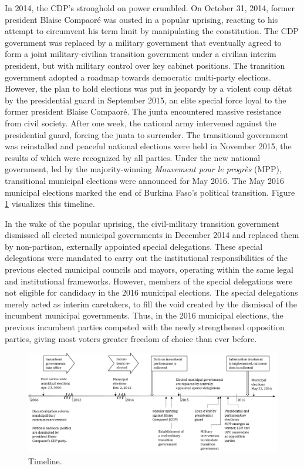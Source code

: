 \documentclass[11pt]{article}
\begin{document}
In 2014, the CDP's stronghold on power crumbled. On October 31, 2014, former president Blaise Compaor\'{e} was ousted in a popular uprising, reacting to his attempt to circumvent his term limit by manipulating the constitution. The CDP government was replaced by a military government that eventually agreed to form a joint military-civilian transition government under a civilian interim president, but with military control over key cabinet positions. The transition government adopted a roadmap towards democratic multi-party elections. However, the plan to hold elections was put in jeopardy by a violent coup d\'{e}tat by the presidential guard in September 2015, an elite special force loyal to the former president Blaise Compaor\'{e}. The junta encountered massive resistance from civil society. After one week, the national army intervened against the presidential guard, forcing the junta to surrender. The transitional government was reinstalled and peaceful national elections were held in November 2015, the results of which were recognized by all parties. Under the new national government, led by the majority-winning \emph{Mouvement pour le progr\`{e}s} (MPP), transitional municipal elections were announced for May 2016. The May 2016 municipal elections marked the end of Burkina Faso's political transition. Figure \ref{FigTimeline} visualizes this timeline. 

In the wake of the popular uprising, the civil-military transition government dismissed all elected municipal governments in December 2014 and replaced them by non-partisan, externally appointed special delegations. These special delegations were mandated to carry out the institutional responsibilities of the previous elected municipal councils and mayors, operating within the same legal and institutional frameworks. However, members of the special delegations were not eligible for candidacy in the 2016 municipal elections. The special delegations merely acted as interim caretakers, to fill the void created by the dismissal of the incumbent municipal governments. Thus, in the 2016 municipal elections, the previous incumbent parties competed with the newly strengthened opposition parties, giving most voters greater freedom of choice than ever before. 

\begin{figure}
\begin{center}
\includegraphics[width=\textwidth]{Figures/BF_Timeline.png}
\end{center}
\caption{Timeline. }
\label{FigTimeline}
\end{figure}
\end{document}
